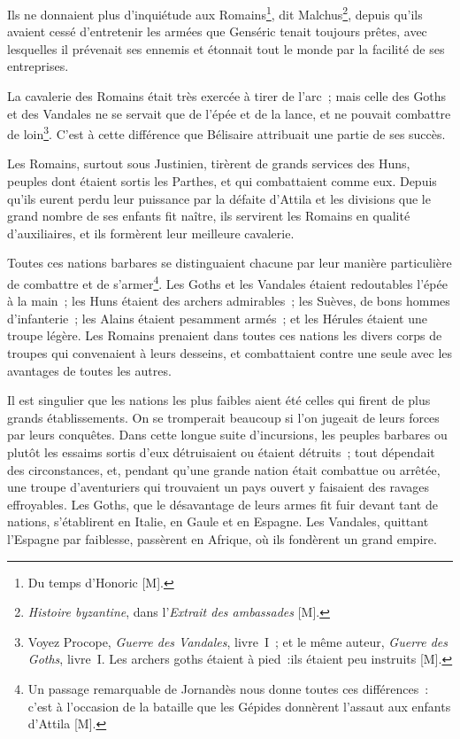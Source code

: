 \documentclass[french,twoside]{book} %
\begin{document}
Ils ne donnaient plus d’inquiétude aux Romains\footnote{Du temps d’Honoric [M].}, dit Malchus\footnote{{\itshape Histoire byzantine}, dans l’{\itshape Extrait des ambassades} [M].}, depuis qu’ils avaient cessé d’entretenir les armées que Genséric tenait toujours prêtes, avec lesquelles il prévenait ses ennemis et étonnait tout le monde par la facilité de ses entreprises.\par
La cavalerie des Romains était très exercée à tirer de l’arc ; mais celle des Goths et des Vandales ne se servait que de l’épée et de la lance, et ne pouvait combattre de loin\footnote{Voyez Procope, {\itshape Guerre des Vandales}, livre I ; et le même auteur, {\itshape Guerre des Goths}, livre I. Les archers goths étaient à pied :ils étaient peu instruits [M].}. C’est à cette différence que Bélisaire attribuait une partie de ses succès.\par
Les Romains, surtout sous Justinien, tirèrent de grands services des Huns, peuples dont étaient sortis les Parthes, et qui combattaient comme eux. Depuis qu’ils eurent perdu leur puissance par la défaite d’Attila et les divisions que le grand nombre de ses enfants fit naître, ils servirent les Romains en qualité d’auxiliaires, et ils formèrent leur meilleure cavalerie.\par
Toutes ces nations barbares se distinguaient chacune par leur manière particulière de combattre et de s’armer\footnote{Un passage remarquable de Jornandès nous donne toutes ces différences : c’est à l’occasion de la bataille que les Gépides donnèrent l’assaut aux enfants d’Attila [M].}. Les Goths et les Vandales étaient redoutables l’épée à la main ; les Huns étaient des archers admirables ; les Suèves, de bons hommes d’infanterie ; les Alains étaient pesamment armés ; et les Hérules étaient une troupe légère. Les Romains prenaient dans toutes ces nations les divers corps de troupes qui convenaient à leurs desseins, et combattaient contre une seule avec les avantages de toutes les autres.\par
Il est singulier que les nations les plus faibles aient été celles qui firent de plus grands établissements. On se tromperait beaucoup si l’on jugeait de leurs forces par leurs conquêtes. Dans cette longue suite d’incursions, les peuples barbares ou plutôt les essaims sortis d’eux détruisaient ou étaient détruits ; tout dépendait des circonstances, et, pendant qu’une grande nation était combattue ou arrêtée, une troupe d’aventuriers qui trouvaient un pays ouvert y faisaient des ravages effroyables. Les Goths, que le désavantage de leurs armes fit fuir devant tant de nations, s’établirent en Italie, en Gaule et en Espagne. Les Vandales, quittant l’Espagne par faiblesse, passèrent en Afrique, où ils fondèrent un grand empire.\par
\end{document}
